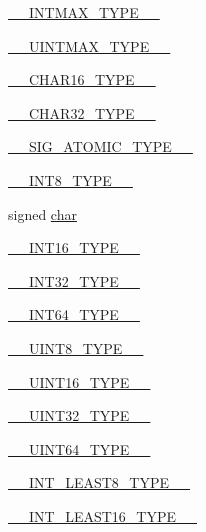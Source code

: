 \begin{DoxyCompactItemize}
\item 
\hyperlink{CMakeCache_8txt_add72759aac6536e641bc2e8c12366d4b}{\+\_\+\+\_\+\+I\+N\+T\+M\+A\+X\+\_\+\+T\+Y\+P\+E\+\_\+\+\_\+}
\item 
\hyperlink{CMakeCache_8txt_ae27a42a4b7ff92c051bf4badd2702611}{\+\_\+\+\_\+\+U\+I\+N\+T\+M\+A\+X\+\_\+\+T\+Y\+P\+E\+\_\+\+\_\+}
\item 
\hyperlink{CMakeCache_8txt_a7e380349dd3aa6cea0d744c2e90e4721}{\+\_\+\+\_\+\+C\+H\+A\+R16\+\_\+\+T\+Y\+P\+E\+\_\+\+\_\+}
\item 
\hyperlink{CMakeCache_8txt_af91b17fdb800ffc733b2eddf51172eac}{\+\_\+\+\_\+\+C\+H\+A\+R32\+\_\+\+T\+Y\+P\+E\+\_\+\+\_\+}
\item 
\hyperlink{CMakeCache_8txt_a2c74d832cde290cb39ee58eda6214a78}{\+\_\+\+\_\+\+S\+I\+G\+\_\+\+A\+T\+O\+M\+I\+C\+\_\+\+T\+Y\+P\+E\+\_\+\+\_\+}
\item 
\hyperlink{CMakeCache_8txt_a7068c995e5075e4589201a350d1cefca}{\+\_\+\+\_\+\+I\+N\+T8\+\_\+\+T\+Y\+P\+E\+\_\+\+\_\+}
\item 
signed \hyperlink{CMakeCache_8txt_afe71f11dacb15682cdc012f7208e6e09}{char}
\item 
\hyperlink{CMakeCache_8txt_aecf40d0b02f3ea9194acecf92ef8ad0b}{\+\_\+\+\_\+\+I\+N\+T16\+\_\+\+T\+Y\+P\+E\+\_\+\+\_\+}
\item 
\hyperlink{CMakeCache_8txt_aff307c0fcea6eefb5eead1fd6d9b8153}{\+\_\+\+\_\+\+I\+N\+T32\+\_\+\+T\+Y\+P\+E\+\_\+\+\_\+}
\item 
\hyperlink{CMakeCache_8txt_aa68c5513d779cc8e92de1fb1e99a1451}{\+\_\+\+\_\+\+I\+N\+T64\+\_\+\+T\+Y\+P\+E\+\_\+\+\_\+}
\item 
\hyperlink{CMakeCache_8txt_acdac745c75cc6d9467f0e8f428cb7c38}{\+\_\+\+\_\+\+U\+I\+N\+T8\+\_\+\+T\+Y\+P\+E\+\_\+\+\_\+}
\item 
\hyperlink{CMakeCache_8txt_a7c334ef15565439f16847268e5aecc00}{\+\_\+\+\_\+\+U\+I\+N\+T16\+\_\+\+T\+Y\+P\+E\+\_\+\+\_\+}
\item 
\hyperlink{CMakeCache_8txt_ae5f84304c1e72cdd73b6da53c4d47f25}{\+\_\+\+\_\+\+U\+I\+N\+T32\+\_\+\+T\+Y\+P\+E\+\_\+\+\_\+}
\item 
\hyperlink{CMakeCache_8txt_ae5334e804b67b171a886cb9c2a6241f0}{\+\_\+\+\_\+\+U\+I\+N\+T64\+\_\+\+T\+Y\+P\+E\+\_\+\+\_\+}
\item 
\hyperlink{CMakeCache_8txt_a0f059754211c536004913c4594b226b7}{\+\_\+\+\_\+\+I\+N\+T\+\_\+\+L\+E\+A\+S\+T8\+\_\+\+T\+Y\+P\+E\+\_\+\+\_\+}
\item 
\hyperlink{CMakeCache_8txt_a6841cc391d897d17cd36b6389eedf1a9}{\+\_\+\+\_\+\+I\+N\+T\+\_\+\+L\+E\+A\+S\+T16\+\_\+\+T\+Y\+P\+E\+\_\+\+\_\+}

\end{DoxyCompactItemize}

